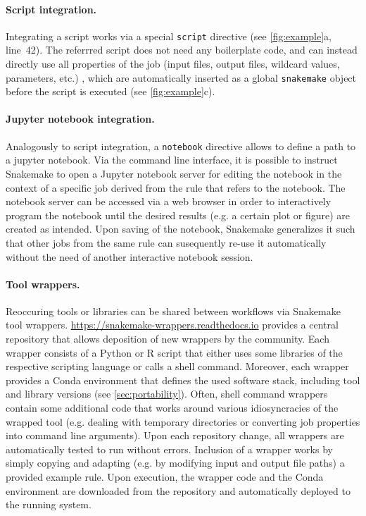 \documentclass[parskip=half]{scrartcl}
\let\plainurl\url
\renewcommand{\url}[1]{\protect\plainurl{#1}}
\begin{document}
\paragraph{Script integration.}
Integrating a script works via a special \lstinline!script! directive (see \autoref{fig:example}a, line~42).
The referrred script does not need any boilerplate code, and can instead directly use all properties of the job (input files, output files, wildcard values, parameters, etc.)
, which are automatically inserted as a global \lstinline!snakemake! object before the script is executed (see \autoref{fig:example}c).

\paragraph{Jupyter notebook integration.}
Analogously to script integration, a \lstinline!notebook! directive allows to define a path to a jupyter notebook.
Via the command line interface, it is possible to instruct Snakemake to open a Jupyter notebook server for editing the notebook in the context of a specific job derived from the rule that refers to the notebook.
The notebook server can be accessed via a web browser in order to interactively program the notebook until the desired results (e.g. a certain plot or figure) are created as intended.
Upon saving of the notebook, Snakemake generalizes it such that other jobs from the same rule can susequently re-use it automatically without the need of another interactive notebook session.

\paragraph{Tool wrappers.}
Reoccuring tools or libraries can be shared between workflows via Snakemake tool wrappers.
\url{https://snakemake-wrappers.readthedocs.io} provides a central repository that allows deposition of new wrappers by the community.
Each wrapper consists of a Python or R script that either uses some libraries of the respective scripting language or calls a shell command.
Moreover, each wrapper provides a Conda environment that defines the used software stack, including tool and library versions (see \autoref{sec:portability}).
Often, shell command wrappers contain some additional code that works around various idiosyncracies of the wrapped tool (e.g. dealing with temporary directories or converting job properties into command line arguments).
Upon each repository change, all wrappers are automatically tested to run without errors.
Inclusion of a wrapper works by simply copying and adapting (e.g. by modifying input and output file paths) a provided example rule.
Upon execution, the wrapper code and the Conda environment are downloaded from the repository and automatically deployed to the running system.
\end{document}
